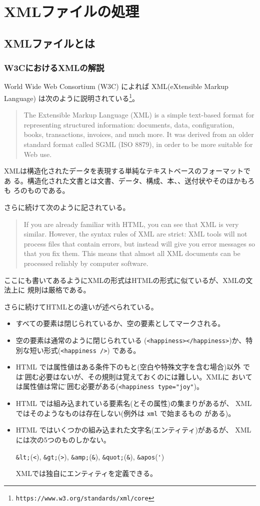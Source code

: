 \chapter{XMLファイルの処理}
\section{XMLファイルとは}
\subsection{W3CにおけるXMLの解説}
World Wide Web Consortium (W3C) によれば XML(eXtensible Markup Language)
は次のように説明されている\footnote{\texttt{https://www.w3.org/standards/xml/core}}。
\begin{quote}
 The Extensible Markup Language (XML) is a simple text-based format for
 representing structured information: documents, data, configuration,
 books, transactions, invoices, and much more. It was derived from an
 older standard format called SGML (ISO 8879), in order to be more
 suitable for Web use. 
\end{quote}
XMLは構造化されたデータを表現する単純なテキストベースのフォーマットであ
る。構造化された文書とは文書、データ、構成、本、、送付状やそのほかもろも
ろのものである。

さらに続けて次のように記されている。
\begin{quote}
 If you are already familiar with HTML, you can see that XML is very
 similar. However, the syntax rules of XML are strict: XML tools will
 not process files that contain errors, but instead will give you error
 messages so that you fix them. This means that almost all XML documents
 can be processed reliably by computer software. 

\end{quote}
ここにも書いてあるようにXMLの形式はHTMLの形式に似ているが、XMLの文法上に
規則は厳格である。

さらに続けてHTMLとの違いが述べられている。
\begin{itemize}
 \item すべての要素は閉じられているか、空の要素としてマークされる。
 \item 空の要素は通常のように閉じられている
			 (\texttt{<happiness></happiness>})か、特別な短い形式(\texttt{<happiness />})
			 である。
 \item HTML では属性値はある条件下のもと(空白や特殊文字を含む場合)以外
			 では\"で囲む必要はないが、その規則は覚えておくのには難しい。XMLに
			 おいては属性値は常に\"で囲む必要がある(\Verb+<happiness type="joy"+)。
 \item HTML では組み込まれている要素名(とその属性)の集まりがあるが、 XML
			 ではそのようなものは存在しない(例外は \texttt{xml} で始まるもの
			 がある)。
 \item  HTML ではいくつかの組み込まれた文字名(エンティティ)があるが、
				XML には次の5つのものしかない。

				\Verb+&lt;+(\Verb+<+), \Verb+&gt;+(\Verb+>+), \Verb+&amp;+(\Verb+&+),
				\Verb+&quot;+(\Verb+&+), \Verb+&apos+(\Verb+'+)

				XMLでは独自にエンティティを定義できる。
\end{itemize}
